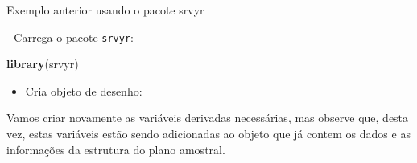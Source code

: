 \documentclass[]{book}
\newenvironment{Shaded}{\begin{snugshade}}{\end{snugshade}}
\newcommand{\KeywordTok}[1]{\textcolor[rgb]{0.13,0.29,0.53}{\textbf{#1}}}
\newcommand{\DataTypeTok}[1]{\textcolor[rgb]{0.13,0.29,0.53}{#1}}
\newcommand{\DecValTok}[1]{\textcolor[rgb]{0.00,0.00,0.81}{#1}}
\newcommand{\StringTok}[1]{\textcolor[rgb]{0.31,0.60,0.02}{#1}}
\newcommand{\OtherTok}[1]{\textcolor[rgb]{0.56,0.35,0.01}{#1}}
\newcommand{\OperatorTok}[1]{\textcolor[rgb]{0.81,0.36,0.00}{\textbf{#1}}}
\newcommand{\NormalTok}[1]{#1}
\providecommand{\tightlist}{%
  \setlength{\itemsep}{0pt}\setlength{\parskip}{0pt}}
\theoremstyle{definition}
\theoremstyle{definition}
\theoremstyle{definition}
\theoremstyle{remark}
\let\BeginKnitrBlock\begin \let\EndKnitrBlock\end
\begin{document}
\BeginKnitrBlock{example}
\protect\hypertarget{exm:exe13}{}{\label{exm:exe13} }Exemplo anterior usando
o pacote srvyr
\EndKnitrBlock{example} - Carrega o pacote \texttt{srvyr}:

\begin{Shaded}
\begin{Highlighting}[]
\KeywordTok{library}\NormalTok{(srvyr)}
\end{Highlighting}
\end{Shaded}

\begin{itemize}
\tightlist
\item
  Cria objeto de desenho:
\end{itemize}

\begin{Shaded}
\end{Shaded}

Vamos criar novamente as variáveis derivadas necessárias, mas observe
que, desta vez, estas variáveis estão sendo adicionadas ao objeto que já
contem os dados e as informações da estrutura do plano amostral.

\begin{Shaded}
\end{Shaded}
\end{document}
